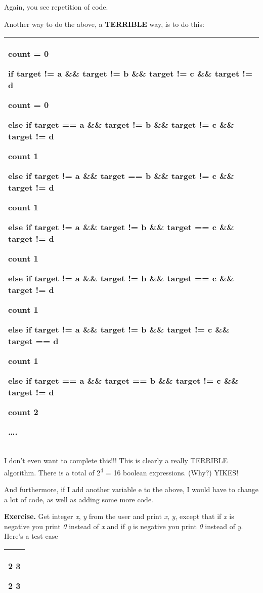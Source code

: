 \documentclass[
]{article}
\begin{document}
Again, you see repetition of code.

Another way to do the above, a \textbf{TERRIBLE} way, is to do this:

\begin{longtable}[]{@{}l@{}}
\toprule
\endhead
\begin{minipage}[t]{0.97\columnwidth}\raggedright
count = 0

if target != a \&\& target != b \&\& target != c \&\& target != d

count = 0

else if target == a \&\& target != b \&\& target != c \&\& target != d

count 1

else if target != a \&\& target == b \&\& target != c \&\& target != d

count 1

else if target != a \&\& target != b \&\& target == c \&\& target != d

count 1

else if target != a \&\& target != b \&\& target == c \&\& target != d

count 1

else if target != a \&\& target != b \&\& target != c \&\& target == d

count 1

else if target == a \&\& target == b \&\& target != c \&\& target != d

count 2

\ldots.\strut
\end{minipage}\tabularnewline
\bottomrule
\end{longtable}

I don't even want to complete this!!! This is clearly a really TERRIBLE
algorithm. There is a total of 2\textsuperscript{4} = 16 boolean
expressions. (Why?) YIKES!

And furthermore, if I add another variable e to the above, I would have
to change a lot of code, as well as adding some more code.

\textbf{Exercise.} Get integer \emph{x}, \emph{y} from the user and
print \emph{x}, \emph{y}, except that if \emph{x }is negative you print
\emph{0} instead of \emph{x} and if \emph{y} is negative you print
\emph{0} instead of \emph{y}. Here's a test case

\begin{longtable}[]{@{}l@{}}
\toprule
\endhead
\begin{minipage}[t]{0.97\columnwidth}\raggedright
2 3

2 3\strut
\end{minipage}\tabularnewline
\bottomrule
\end{longtable}
\end{document}
